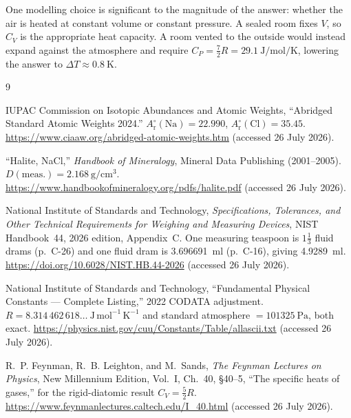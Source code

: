 \documentclass[11pt]{article}
\begin{document}
One modelling choice is significant to the magnitude of the answer: whether the
air is heated at constant volume or constant pressure. A sealed room fixes $V$,
so $C_V$ is the appropriate heat capacity. A room vented to the outside would
instead expand against the atmosphere and require $C_P = \tfrac{7}{2}R =
\qty{29.1}{\joule\per\mole\per\kelvin}$, lowering the answer to $\Delta T
\approx \qty{0.8}{\kelvin}$.

\clearpage
\begin{thebibliography}{9}
\raggedright

IUPAC Commission on Isotopic Abundances and Atomic Weights,
``Abridged Standard Atomic Weights 2024.''
$A_\mathrm{r}^{\circ}(\mathrm{Na}) = 22.990$,
$A_\mathrm{r}^{\circ}(\mathrm{Cl}) = 35.45$.
\url{https://www.ciaaw.org/abridged-atomic-weights.htm}
(accessed 26 July 2026).

``Halite, NaCl,'' \emph{Handbook of Mineralogy},
Mineral Data Publishing (2001--2005).
$D(\text{meas.}) = \qty{2.168}{\gram\per\cubic\cm}$.
\url{https://www.handbookofmineralogy.org/pdfs/halite.pdf}
(accessed 26 July 2026).

National Institute of Standards and Technology,
\emph{Specifications, Tolerances, and Other Technical Requirements for
Weighing and Measuring Devices}, NIST Handbook~44, 2026 edition,
Appendix~C. One measuring teaspoon is $1\tfrac{1}{3}$ fluid drams
(p.~C-26) and one fluid dram is \qty{3.696691}{\milli\litre} (p.~C-16),
giving \qty{4.9289}{\milli\litre}.
\url{https://doi.org/10.6028/NIST.HB.44-2026}
(accessed 26 July 2026).

National Institute of Standards and Technology,
``Fundamental Physical Constants --- Complete Listing,''
2022 CODATA adjustment.
$R = 8.314\,462\,618\ldots\ \mathrm{J\,mol^{-1}\,K^{-1}}$ and
standard atmosphere $= \qty{101325}{\pascal}$, both exact.
\url{https://physics.nist.gov/cuu/Constants/Table/allascii.txt}
(accessed 26 July 2026).

R.~P. Feynman, R.~B. Leighton, and M.~Sands,
\emph{The Feynman Lectures on Physics}, New Millennium Edition,
Vol.~I, Ch.~40, \S40--5, ``The specific heats of gases,''
for the rigid-diatomic result $C_V = \tfrac{5}{2}R$.
\url{https://www.feynmanlectures.caltech.edu/I\_40.html}
(accessed 26 July 2026).

\end{thebibliography}
\end{document}
